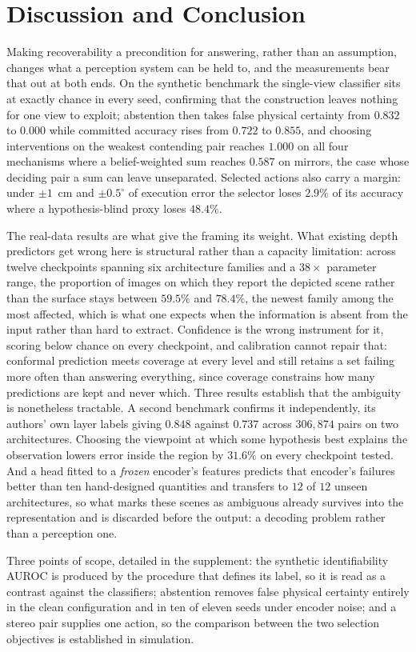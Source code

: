 \section{Discussion and Conclusion}
\label{sec:discussion}

Making recoverability a precondition for answering, rather than an assumption,
changes what a perception system can be held to, and the measurements bear that
out at both ends. On the synthetic benchmark the single-view classifier sits at
exactly chance in every seed, confirming that the construction leaves nothing for
one view to exploit; abstention then takes false physical certainty from $0.832$ to
$0.000$ while committed accuracy rises from $0.722$ to $0.855$, and choosing
interventions on the weakest contending pair reaches $1.000$ on all four mechanisms
where a belief-weighted sum reaches $0.587$ on mirrors, the case whose deciding
pair a sum can leave unseparated. Selected actions also carry a margin: under
$\pm 1$~cm and $\pm 0.5^{\circ}$ of execution error the selector loses $2.9\%$ of
its accuracy where a hypothesis-blind proxy loses $48.4\%$.

The real-data results are what give the framing its weight. What existing depth
predictors get wrong here is structural rather than a capacity limitation: across
twelve checkpoints spanning six architecture families and a $38\times$ parameter
range, the proportion of images on which they report the depicted scene rather than
the surface stays between $59.5\%$ and $78.4\%$, the newest family among the most
affected, which is what one expects when the information is absent from the input
rather than hard to extract. Confidence is the wrong instrument for it, scoring
below chance on every checkpoint, and calibration cannot repair that: conformal
prediction meets coverage at every level and still retains a set failing more often
than answering everything, since coverage constrains how many predictions are kept
and never which. Three results establish that the ambiguity is nonetheless
tractable. A second benchmark confirms it independently, its authors' own layer
labels giving $0.848$ against $0.737$ across $306{,}874$ pairs on two
architectures. Choosing the viewpoint at which some hypothesis best explains the
observation lowers error inside the region by $31.6\%$ on every checkpoint tested.
And a head fitted to a \emph{frozen} encoder's features predicts that encoder's
failures better than ten hand-designed quantities and transfers to $12$ of $12$
unseen architectures, so what marks these scenes as ambiguous already survives into
the representation and is discarded before the output: a decoding problem rather
than a perception one.

Three points of scope, detailed in the supplement: the synthetic identifiability
AUROC is produced by the procedure that defines its label, so it is read as a
contrast against the classifiers; abstention removes false physical certainty
entirely in the clean configuration and in ten of eleven seeds under encoder noise;
and a stereo pair supplies one action, so the comparison between the two selection
objectives is established in simulation.
